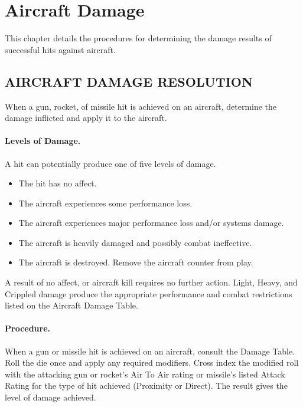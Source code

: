 \section{Aircraft Damage}

This chapter details the procedures for determining the damage results of successful hits against aircraft.

\subsection{AIRCRAFT DAMAGE RESOLUTION}

When a gun, rocket, of missile hit is achieved on an aircraft, determine the damage inflicted and apply it to the aircraft.

\paragraph{Levels of Damage.} A hit can potentially produce one of five levels of damage.

\begin{itemize}

    \item{} The hit has no affect.

    \item{} The aircraft experiences some performance loss.
    
    \item{} The aircraft experiences major performance loss and/or systems damage.

    \item{} The aircraft is heavily damaged and possibly combat ineffective.
    
    \item{} The aircraft is destroyed. Remove the aircraft counter from play.

\end{itemize}

A result of no affect, or aircraft kill requires no further action. Light, Heavy, and Crippled damage produce the appropriate performance and combat restrictions listed on the Aircraft Damage Table.

\paragraph{Procedure.} When a gun or missile hit is achieved on an aircraft, consult the Damage Table. Roll the die once and apply any required modifiers. Cross index the modified roll with the attacking gun or rocket's Air To Air rating or missile's listed Attack Rating for the type of hit achieved (Proximity or Direct). The result gives the level of damage achieved.

